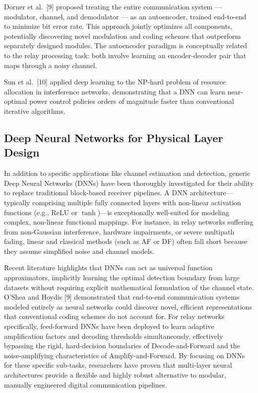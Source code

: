 Dorner et al.~{[}9{]} proposed treating the entire communication system --- modulator, channel, and demodulator --- as an autoencoder, trained end-to-end to minimize bit error rate. This approach jointly optimizes all components, potentially discovering novel modulation and coding schemes that outperform separately designed modules. The autoencoder paradigm is conceptually related to the relay processing task: both involve learning an encoder-decoder pair that maps through a noisy channel.

Sun et al.~{[}10{]} applied deep learning to the NP-hard problem of resource allocation in interference networks, demonstrating that a DNN can learn near-optimal power control policies orders of magnitude faster than conventional iterative algorithms.


\subsection{Deep Neural Networks for Physical Layer Design}

In addition to specific applications like channel estimation and detection, generic Deep Neural Networks (DNNs) have been thoroughly investigated for their ability to replace traditional block-based receiver pipelines. A DNN architecture---typically comprising multiple fully connected layers with non-linear activation functions (e.g., ReLU or $\tanh$)---is exceptionally well-suited for modeling complex, non-linear functional mappings. For instance, in relay networks suffering from non-Gaussian interference, hardware impairments, or severe multipath fading, linear and classical methods (such as AF or DF) often fall short because they assume simplified noise and channel models.

Recent literature highlights that DNNs can act as universal function approximators, implicitly learning the optimal detection boundary from large datasets without requiring explicit mathematical formulation of the channel state. O'Shea and Hoydis [9] demonstrated that end-to-end communication systems modeled entirely as neural networks could discover novel, efficient representations that conventional coding schemes do not account for. For relay networks specifically, feed-forward DNNs have been deployed to learn adaptive amplification factors and decoding thresholds simultaneously, effectively bypassing the rigid, hard-decision boundaries of Decode-and-Forward and the noise-amplifying characteristics of Amplify-and-Forward. By focusing on DNNs for these specific sub-tasks, researchers have proven that multi-layer neural architectures provide a flexible and highly robust alternative to modular, manually engineered digital communication pipelines.



